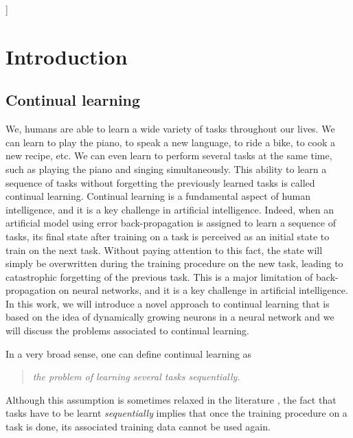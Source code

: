 \documentclass[11pt]{article}
\begin{document}
\tableofcontents]



\clearpage



\section{Introduction}



\subsection{Continual learning}


We, humans are able to learn a wide variety of tasks throughout our lives. We can learn to play the piano, to speak a new language, to ride a bike, to cook a new recipe, etc. We can even learn to perform several tasks at the same time, such as playing the piano and singing simultaneously. This ability to learn a sequence of tasks without forgetting the previously learned tasks is called continual learning. Continual learning is a fundamental aspect of human intelligence, and it is a key challenge in artificial intelligence. Indeed, when an artificial model using error back-propagation \cite{backprop} is assigned to learn a sequence of tasks, its final state after training on a task is perceived as an initial state to train on the next task. Without paying attention to this fact, the state will simply be overwritten during the training procedure on the new task, leading to catastrophic forgetting of the previous task. This is a major limitation of back-propagation on neural networks, and it is a key challenge in artificial intelligence. In this work, we will introduce a novel approach to continual learning that is based on the idea of dynamically growing neurons in a neural network and we will discuss the problems associated to continual learning.

\vspace{2mm}
\noindent
In a very broad sense, one can define continual learning as

\begin{quote}
    \itshape
    \centering
    the problem of learning several tasks sequentially.
\end{quote}
Although this assumption is sometimes relaxed in the literature \cite{replay_3}, the fact that tasks have to be learnt \textit{sequentially} implies that once the training procedure on a task is done, its associated training data cannot be used again. 
\end{document}
